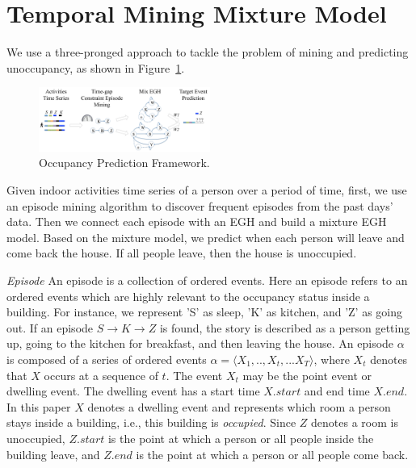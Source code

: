 \section{Temporal Mining Mixture Model}
We use a three-pronged approach to tackle the problem of mining and predicting unoccupancy, as 
shown in Figure~\ref{fig_framework}.
\begin{figure}[h]
\centering
\includegraphics[width=0.5\textwidth]{adlfigs/framework.pdf}
\caption{Occupancy Prediction Framework.\label{fig_framework}}
\end{figure}
Given indoor activities time series of a person over a period of time, 
first, we use an episode mining algorithm to discover frequent episodes from the past days' data. Then we connect each episode with an EGH and build a mixture EGH model. 
Based on the mixture model, we predict when each person will leave and come back the house. 
If all people leave, then the house is unoccupied. 


\textit{Episode} 
An episode is a collection of ordered events. 
Here an episode refers to an ordered events which are 
highly relevant to the occupancy status inside a building. 
For instance, we represent 'S' as sleep, 
'K' as kitchen, and 'Z' as going out. 
If an episode $S \rightarrow K \rightarrow Z$ is found, 
the story is described as a person getting up, 
going to the kitchen for breakfast, and then leaving the house. 
An episode $\alpha$ is composed 
of a series of ordered events
$\alpha=\langle X_1,..,X_t,...X_T \rangle$, 
where $X_t$ denotes that $X$ occurs at a sequence of $t$.  
The event $X_t$ may be the point event or dwelling event. 
The dwelling event
has a start time $X.start$ and end time $X.end$. 
In this paper  $X$ denotes a dwelling event and 
represents which room a person stays 
inside a building, i.e., this building is \emph{occupied}. 
Since $Z$ denotes a room is unoccupied, 
$Z.start$ is the point at which a person or all people inside the building leave, and 
$Z.end$ is the point at which a person or all people come back. 


